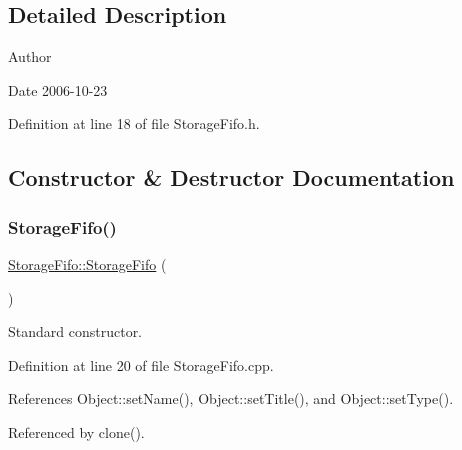 \subsection{Detailed Description}
\begin{DoxyAuthor}{Author}

\end{DoxyAuthor}
\begin{DoxyDate}{Date}
2006-\/10-\/23 
\end{DoxyDate}


Definition at line 18 of file Storage\+Fifo.\+h.



\subsection{Constructor \& Destructor Documentation}
\mbox{\label{classStorageFifo_a223700b2d5de3bd59ccf76df29f979d3}} 
\subsubsection{\texorpdfstring{Storage\+Fifo()}{StorageFifo()}}
{\footnotesize\ttfamily \hyperlink{classStorageFifo_1_1StorageFifo}{Storage\+Fifo\+::\+Storage\+Fifo} (\begin{DoxyParamCaption}{ }\end{DoxyParamCaption})}



Standard constructor. 



Definition at line 20 of file Storage\+Fifo.\+cpp.



References Object\+::set\+Name(), Object\+::set\+Title(), and Object\+::set\+Type().



Referenced by clone().


